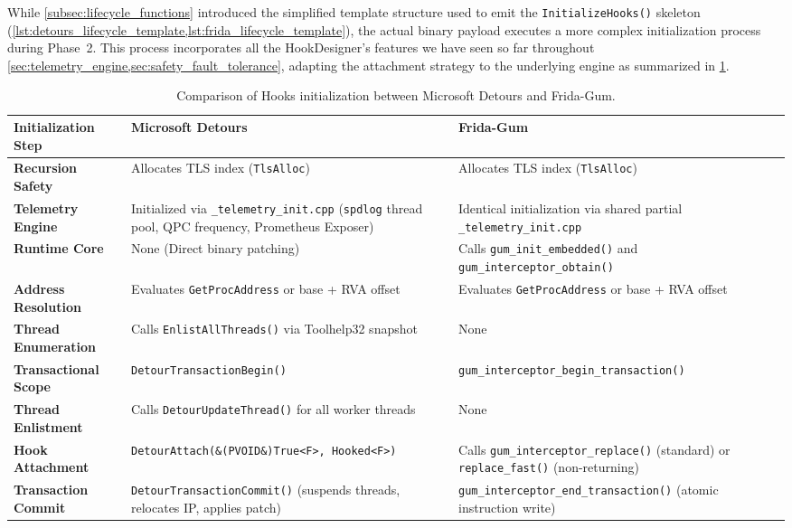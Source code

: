 While \cref{subsec:lifecycle_functions} introduced the simplified template structure used to emit the \texttt{InitializeHooks()} skeleton (\cref{lst:detours_lifecycle_template,lst:frida_lifecycle_template}), the actual binary payload executes a more complex initialization process during Phase~2.
This process incorporates all the HookDesigner's features we have seen so far throughout \cref{sec:telemetry_engine,sec:safety_fault_tolerance}, adapting the attachment strategy to the underlying engine as summarized in \cref{tab:engine_init_comparison}.

\begin{table}[H]
	\centering
	\small
	\begin{tabular}{p{3.2cm}p{5.6cm}p{5.7cm}}
		\toprule
		\textbf{Initialization Step} & \textbf{Microsoft Detours} & \textbf{Frida-Gum} \\
		\midrule
		\textbf{Recursion Safety} & Allocates TLS index (\texttt{TlsAlloc}) & Allocates TLS index (\texttt{TlsAlloc}) \\
		\addlinespace
		\textbf{Telemetry Engine} & Initialized via \texttt{\_telemetry\_init.cpp} (\texttt{spdlog} thread pool, QPC frequency, Prometheus Exposer) & Identical initialization via shared partial \texttt{\_telemetry\_init.cpp} \\
		\addlinespace
		\textbf{Runtime Core} & None (Direct binary patching) & Calls \texttt{gum\_init\_embedded()} and \texttt{gum\_interceptor\_obtain()} \\
		\addlinespace
		\textbf{Address Resolution} & Evaluates \texttt{GetProcAddress} or base + \ac{RVA} offset & Evaluates \texttt{GetProcAddress} or base + \ac{RVA} offset \\
		\addlinespace
		\textbf{Thread Enumeration} & Calls \texttt{EnlistAllThreads()} via Toolhelp32 snapshot & None \\
		\addlinespace
		\textbf{Transactional Scope} & \texttt{DetourTransactionBegin()} & \texttt{gum\_interceptor\_}\allowbreak\texttt{begin\_transaction()} \\
		\addlinespace
		\textbf{Thread Enlistment} & Calls \texttt{DetourUpdateThread()} for all worker threads & None \\
		\addlinespace
		\textbf{Hook Attachment} & \texttt{DetourAttach(}\allowbreak\texttt{\&(PVOID\&)True<F>,}\allowbreak\texttt{ Hooked<F>)} & Calls \texttt{gum\_interceptor\_}\allowbreak\texttt{replace()} (standard) or \texttt{replace\_fast()} (non-returning) \\
		\addlinespace
		\textbf{Transaction Commit} & \texttt{DetourTransactionCommit()} (suspends threads, relocates \ac{IP}, applies patch) & \texttt{gum\_interceptor\_}\allowbreak\texttt{end\_transaction()} (atomic instruction write) \\
		\bottomrule
	\end{tabular}
	\caption{Comparison of Hooks initialization between Microsoft Detours and Frida-Gum.}
	\label{tab:engine_init_comparison}
\end{table}

